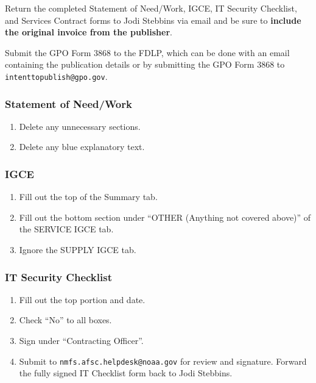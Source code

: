\documentclass[
  letterpaper,
  DIV=11,
  numbers=noendperiod]{scrreprt}
\providecommand{\tightlist}{%
  \setlength{\itemsep}{0pt}\setlength{\parskip}{0pt}}\usepackage{longtable,booktabs,array}
\begin{document}
Return the completed Statement of Need/Work, IGCE, IT Security
Checklist, and Services Contract forms to Jodi Stebbins via email and be
sure to \textbf{include the original invoice from the publisher}.

Submit the GPO Form 3868 to the FDLP, which can be done with an email
containing the publication details or by submitting the GPO Form 3868 to
\texttt{intenttopublish@gpo.gov}.

\subsubsection{Statement of Need/Work}\label{statement-of-needwork}

\begin{enumerate}
\def\labelenumi{\arabic{enumi}.}
\tightlist
\item
  Delete any unnecessary sections.\\
\item
  Delete any blue explanatory text.
\end{enumerate}

\subsubsection{IGCE}\label{igce}

\begin{enumerate}
\def\labelenumi{\arabic{enumi}.}
\tightlist
\item
  Fill out the top of the Summary tab.\\
\item
  Fill out the bottom section under ``OTHER (Anything not covered
  above)'' of the SERVICE IGCE tab.\\
\item
  Ignore the SUPPLY IGCE tab.
\end{enumerate}

\subsubsection{IT Security Checklist}\label{it-security-checklist}

\begin{enumerate}
\def\labelenumi{\arabic{enumi}.}
\tightlist
\item
  Fill out the top portion and date.\\
\item
  Check ``No'' to all boxes.\\
\item
  Sign under ``Contracting Officer''.\\
\item
  Submit to \texttt{nmfs.afsc.helpdesk@noaa.gov} for review and
  signature. Forward the fully signed IT Checklist form back to Jodi
  Stebbins.
\end{enumerate}
\end{document}
